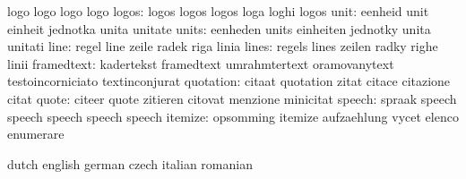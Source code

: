                           logo                      logo
                           logo                      logo
                    logos: logos                     logos
                           logos                     loga
                           loghi                     logos
                     unit: eenheid                   unit
                           einheit                   jednotka
                           unita                     unitate
                    units: eenheden                  units
                           einheiten                 jednotky
                           unita                     unitati
                     line: regel                     line
                           zeile                     radek
                           riga                      linia
                    lines: regels                    lines
                           zeilen                    radky
                           righe                     linii
               framedtext: kadertekst                framedtext
                           umrahmtertext             oramovanytext
                           testoincorniciato         textinconjurat
                quotation: citaat                    quotation
                           zitat                     citace
                           citazione                 citat
                    quote: citeer                    quote
                           zitieren                  citovat
                           menzione                  minicitat
                   speech: spraak                    speech
                           speech                    speech
                           speech                    speech
                  itemize: opsomming                 itemize
                           aufzaehlung               vycet
                           elenco                    enumerare

\stopvariables




\startconstants            dutch                     english
                           german                    czech
                           italian                   romanian

